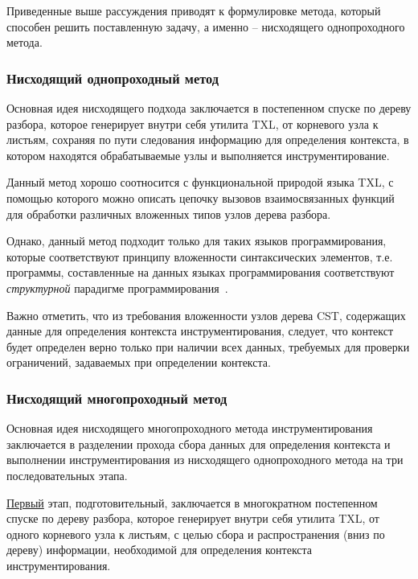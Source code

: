 Приведенные выше рассуждения приводят к формулировке метода, который способен решить поставленную задачу, а именно -- нисходящего однопроходного метода.

\subsubsection{Нисходящий однопроходный метод}


Основная идея нисходящего подхода заключается в постепенном спуске по дереву разбора, которое генерирует внутри себя утилита TXL, от корневого узла к листьям, сохраняя по пути следования информацию для определения контекста, в котором находятся обрабатываемые узлы и выполняется инструментирование.

Данный метод хорошо соотносится с функциональной природой языка TXL, с помощью которого можно описать цепочку вызовов взаимосвязанных функций для обработки различных вложенных типов узлов дерева разбора.

Однако, данный метод подходит только для таких языков программирования, которые соответствуют принципу вложенности синтаксических элементов, т.е. программы, составленные на данных языках программирования соответствуют \textit{структурной} парадигме программирования~\cite{struct-programming}.

Важно отметить, что из требования вложенности узлов дерева CST, содержащих данные для определения контекста инструментирования, следует, что контекст будет определен верно только при наличии всех данных, требуемых для проверки ограничений, задаваемых при определении контекста.

\subsubsection{Нисходящий многопроходный метод}

Основная идея нисходящего многопроходного метода инструментирования заключается в разделении прохода сбора данных для определения контекста и выполнении инструментирования из нисходящего однопроходного метода на три последовательных этапа.

\underline{Первый} этап, подготовительный, заключается в многократном постепенном спуске по дереву разбора, которое генерирует внутри себя утилита TXL, от одного корневого узла к листьям, с целью сбора и распространения (вниз по дереву) информации, необходимой для определения контекста инструментирования.

